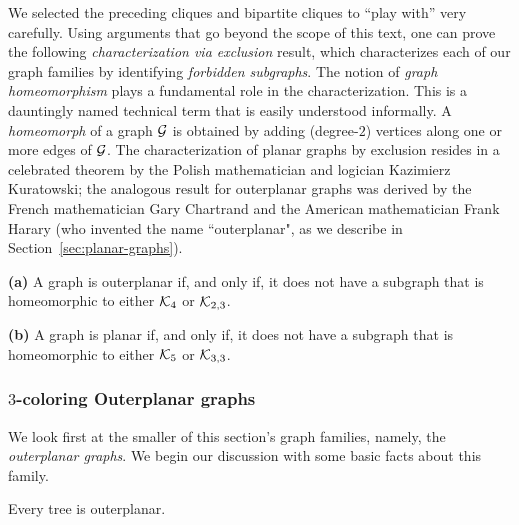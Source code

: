 We selected the preceding cliques and bipartite cliques to ``play with'' very carefully.
Using arguments that go beyond the scope of this text, one can prove the following
{\em characterization via exclusion} result, which characterizes each of our graph families by
identifying {\it forbidden subgraphs}.  
The notion of {\it graph homeomorphism} plays a fundamental role in the characterization.
This is a dauntingly named technical term that is easily understood informally.
A {\it homeomorph} of a graph $\mbox{$\cal G$}$ is obtained by adding (degree-$2$) vertices along one
or more edges of $\mbox{$\cal G$}$.  The characterization of planar graphs by exclusion resides in a
celebrated theorem by the Polish mathematician and logician Kazimierz Kuratowski; the
analogous result for outerplanar graphs was derived by the French mathematician Gary
Chartrand and the American mathematician Frank Harary (who invented the name ``outerplanar", as
we describe in Section~\ref{sec:planar-graphs}).
 
\begin{theorem}
\label{thm:planar+outerplanar-exclusion}
{\bf (a)} {\rm \cite{ChartrandB67}}
A graph is outerplanar if, and only if, it does not have a subgraph
that is homeomorphic to either $\mbox{$\cal K$}_4$ or $\mbox{$\cal K$}_{2,3}$.

{\bf (b)} {\rm \cite{Kuratowski30}}
A graph is planar if, and only if, it does not have a subgraph
that is homeomorphic to either $\mbox{$\cal K$}_5$ or $\mbox{$\cal K$}_{3,3}$.
\end{theorem}


\subsubsection{$3$-coloring Outerplanar graphs}

We look first at the smaller of this section's graph families, namely,
the {\it outerplanar graphs}. 
We begin our discussion with some basic facts about this family.

\begin{prop}
Every tree is outerplanar.
\end{prop}

